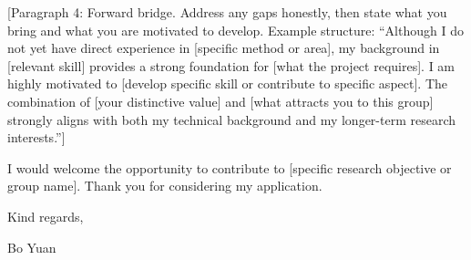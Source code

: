 \documentclass[a4paper,11pt]{article}
\begin{document}
\vspace{0.3cm}

[Paragraph 4: Forward bridge. Address any gaps honestly, then state what you bring
and what you are motivated to develop. Example structure: ``Although I do not yet
have direct experience in [specific method or area], my background in [relevant
skill] provides a strong foundation for [what the project requires]. I am highly
motivated to [develop specific skill or contribute to specific aspect]. The
combination of [your distinctive value] and [what attracts you to this group]
strongly aligns with both my technical background and my longer-term research
interests.'']

\vspace{0.3cm}

I would welcome the opportunity to contribute to [specific research objective or
group name]. Thank you for considering my application.

\vspace{0.6cm}

\noindent
Kind regards, \\

\vspace{0.3cm}

\noindent
Bo Yuan
\end{document}
